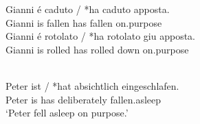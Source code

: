 \documentclass[output=paper]{langsci/langscibook}
\begin{document}
\ea\label{ex:key:10.25}  \parencite{FolliHarley2006}
    \ea
	\gll    Gianni é  caduto  /  *ha  caduto  apposta.\\
            Gianni is fallen {} \hphantom{*}has  fallen    on.purpose\\
    \ex
	\gll    Gianni é rotolato  /  *ha  rotolato  giu  apposta.\\
            Gianni is rolled {} \hphantom{*}has  rolled    down  on.purpose\\
    \z
\z

\ea\label{ex:key:10.26} \\
    \gll    Peter ist / *hat  absichtlich  eingeschlafen.\\
            Peter is {} \hphantom{*}has  deliberately fallen.asleep\\
    \glt    ‘Peter fell asleep on purpose.’
\z
\end{document}
